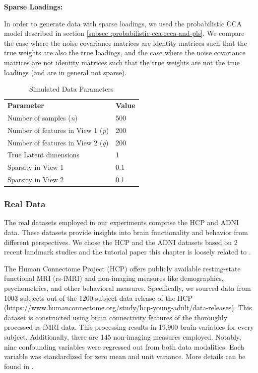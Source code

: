 \textbf{Sparse Loadings:}

In order to generate data with sparse loadings, we used the probabilistic CCA model described in section \ref{subsec
:probabilistic-cca-rcca-and-pls}. We compare the case where the noise covariance matrices are identity matrices such
that the true weights are also the true loadings, and the case where the noise covariance matrices are not identity matrices
such that the true weights are not the true loadings (and are in general not sparse).

\begin{table}[h]
\centering
\caption{Simulated Data Parameters}
\begin{tabular}{| l | l |}
\textbf{Parameter} & \textbf{Value} \\
Number of samples (\textit{n}) & 500 \\
Number of features in View 1 (\textit{p}) & 200 \\
Number of features in View 2 (\textit{q}) & 200 \\
True Latent dimensions & 1 \\
Sparsity in View 1 & 0.1 \\
Sparsity in View 2 & 0.1 \\
\end{tabular}
\end{table}


\subsubsection{Real Data}

The real datasets employed in our experiments comprise the HCP and ADNI data. These datasets provide insights into brain functionality and behavior from different perspectives.
We chose the HCP and the ADNI datasets based on 2
recent landmark studies and the tutorial paper this chapter is loosely related to \cite{mihalik2022canonical}. 


The Human Connectome Project (HCP) offers publicly available resting-state functional MRI (rs-fMRI) and non-imaging
measures like demographics, psychometrics, and other behavioral measures.
Specifically, we sourced data from 1003
subjects out of the 1200-subject data release of the HCP (\url{https://www.humanconnectome.org/study/hcp-young-adult/data-releases}). This dataset is constructed using brain connectivity features of the thoroughly processed rs-fMRI data. This processing results in 19,900 brain variables for every subject. Additionally, there are 145 non-imaging measures employed. Notably, nine confounding variables were regressed out from both data modalities. Each variable was standardized for zero mean and unit variance. More details can be found in \cite{smith2015positive, mihalik2022canonical}.


